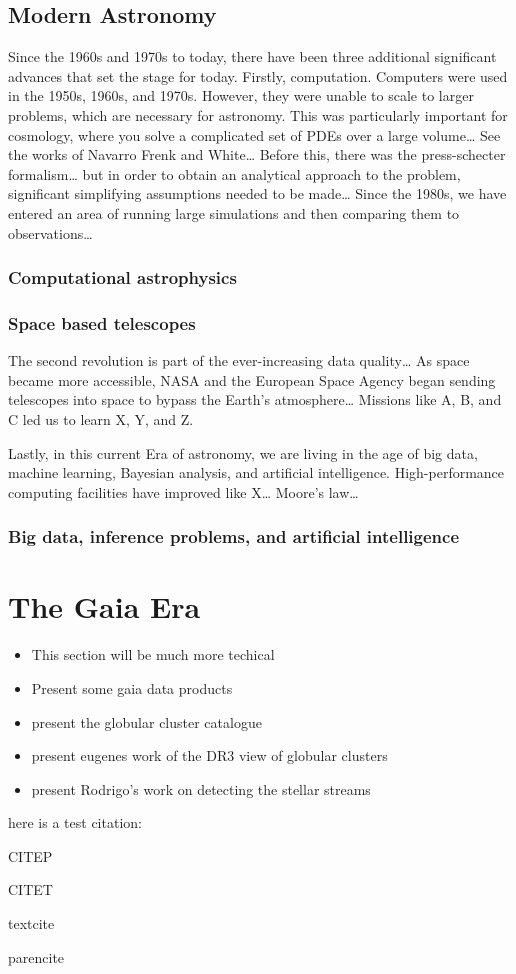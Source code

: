 \subsection{Modern Astronomy}
Since the 1960s and 1970s to today, there have been three additional significant advances that set the stage for today. Firstly, computation. Computers were used in the 1950s, 1960s, and 1970s. However, they were unable to scale to larger problems, which are necessary for astronomy. This was particularly important for cosmology, where you solve a complicated set of PDEs over a large volume… See the works of Navarro Frenk and White… Before this, there was the press-schecter formalism… but in order to obtain an analytical approach to the problem, significant simplifying assumptions needed to be made… Since the 1980s, we have entered an area of running large simulations and then comparing them to observations… 

\subsubsection*{Computational astrophysics}

\subsubsection*{Space based telescopes}

The second revolution is part of the ever-increasing data quality… As space became more accessible, NASA and the European Space Agency began sending telescopes into space to bypass the Earth's atmosphere… Missions like A, B, and C led us to learn X, Y, and Z. 


Lastly, in this current Era of astronomy, we are living in the age of big data, machine learning, Bayesian analysis, and artificial intelligence. High-performance computing facilities have improved like X… Moore's law… 


\subsubsection*{Big data, inference problems, and artificial intelligence }

\section{The Gaia Era}
    \begin{itemize}
        \item This section will be much more techical 
        \item Present some gaia data products 
        \item present the globular cluster catalogue
        \item present eugenes work of the DR3 view of globular clusters 
        \item present Rodrigo's work on detecting the stellar streams 
    \end{itemize}

    here is a test citation: \cite{2023A&A...673A..44F}

    CITEP \citep{2023A&A...673A..44F}


    CITET \citet{2023A&A...673A..44F}


    textcite \textcite{2023A&A...673A..44F}


    parencite \parencite{2023A&A...673A..44F}
